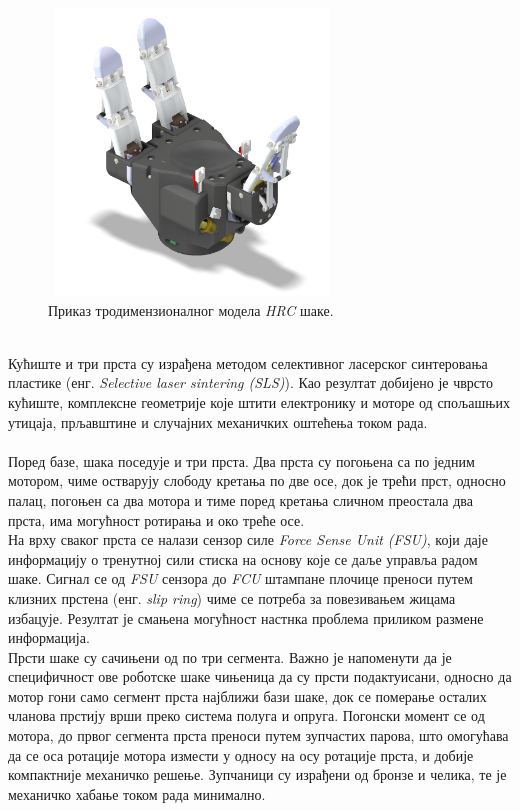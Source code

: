 \documentclass{article}
\begin{document}
\begin{figure}[H]
\centering
\includegraphics[width=3in, height=3in]{Images/Saka.png}
\caption{Приказ тродимензионалног модела \textit{HRC} шаке.}
\label{fig:figure6}
\end{figure}
\ \\
Кућиште и три прста су израђена методом селективног ласерског синтеровања пластике (енг. \textit{Selective laser sintering (SLS)}).
Као резултат добијено је чврсто кућиште, комплексне геометрије које штити електронику и моторе од спољашњих утицаја, прљавштине и 
случајних механичких оштећења током рада.\\
\ \\
Поред базе, шака поседује и три прста. Два прста су погоњена са по једним мотором, чиме остварују слободу кретања по две осе,
док је трећи прст, односно палац, погоњен са два мотора и тиме поред кретања сличном преостала два прста, има могућност
ротирања и око треће осе.\\
На врху сваког прста се налази сензор силе \textit{Force Sense Unit (FSU)}, који даје информацију о тренутној сили стиска
на основу које се даље управља радом шаке. Сигнал се од \textit{FSU} сензора до \textit{FCU} штампане плочице преноси путем 
клизних прстена (енг. \textit{slip ring}) чиме се потреба за повезивањем жицама избацује. Резултат
је смањена могућност настнка проблема приликом размене информација.\\
Прсти шаке су сачињени од по три сегмента. Важно је напоменути да је специфичност ове роботске шаке чињеница да су прсти подактуисани, 
односно да мотор гони само сегмент прста најближи бази шаке, док се померање осталих чланова прстију врши преко система полуга и опруга. 
Погонски момент се од мотора, до првог сегмента прста преноси путем зупчастих
парова, што омогућава да се оса ротације мотора измести у односу на осу ротације прста, и добије компактније механичко 
решење. Зупчаници су израђени од бронзе и челика, те је механичко хабање током рада минимално.
\end{document}
